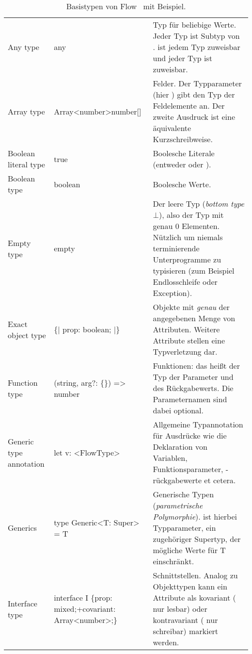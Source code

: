 \begin{longtabuenv}
\begin{longtabu} to 
    \midrule
     &  &  \\
    \midrule
  \endhead
    \midrule
    \caption{Basistypen von Flow~\autocite{FLOW:TYPE_ANNOTATIONS} mit Beispiel.}
  \endfoot
  Any type                 & any                             & Typ für beliebige Werte. Jeder Typ ist Subtyp von .  ist jedem Typ zuweisbar und jeder Typ ist  zuweisbar. \medskip\\
  Array type               & Array<number>\newline number[]  & Felder. Der Typparameter (hier ) gibt den Typ der Feldelemente an. Der zweite Ausdruck ist eine äquivalente Kurzschreibweise.\medskip\\
  Boolean literal type     & true                            & Boolesche Literale (entweder  oder ). \medskip\\
  Boolean type             & boolean                         & Boolesche Werte. \medskip\\
  Empty type               & empty                           & Der leere Typ (\textit{bottom type} $\bot$), also der Typ mit genau 0 Elementen. Nützlich um niemals terminierende Unterprogramme zu typisieren (zum Beispiel Endlosschleife oder Exception). \medskip\\
  Exact object type        & \{| prop: boolean; |\}          & Objekte mit \emph{genau} der angegebenen Menge von Attributen. Weitere Attribute stellen eine Typverletzung dar.\medskip\\
  Function type            & (string, arg?: \{\}) => number  & Funktionen: das heißt der Typ der Parameter und des Rückgabewerts. Die Parameternamen sind dabei optional. \medskip\\
  Generic type annotation  & let v: <{}FlowType>{}           & Allgemeine Typannotation für Ausdrücke wie die Deklaration von Variablen, Funktionsparameter, -rückgabewerte et cetera. \medskip\\
  Generics                 & type Generic<{}T: Super> = T    & Generische Typen (\textit{parametrische Polymorphie}).  ist hierbei Typparameter,  ein zugehöriger Supertyp, der mögliche Werte für T einschränkt. \medskip\\
  Interface type           & interface I \{\newline\hspace*{1.25em}prop: mixed;\newline\hspace*{1.25em}+covariant: Array<number>;\newline\}\medskip & Schnittstellen. Analog zu Objekttypen kann ein Attribute als kovariant (\code{+} nur lesbar) oder kontravariant (\code{-} nur schreibar) markiert werden. \medskip\\

\end{longtabu}
\end{longtabuenv}
